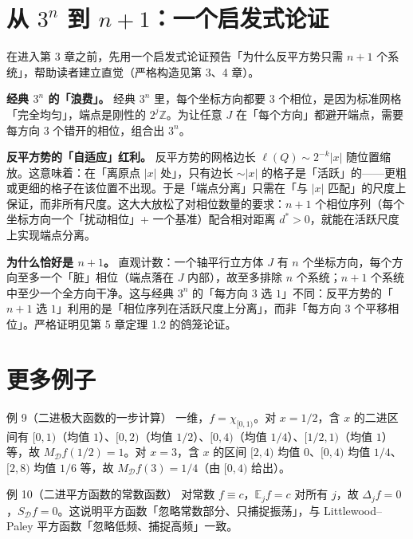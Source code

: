 \documentclass[a4paper,11pt,openany]{ctexbook}
\numberwithin{equation}{chapter}
\numberwithin{figure}{chapter}
\numberwithin{table}{chapter}
\begin{document}
\section{从 $3^n$ 到 $n+1$：一个启发式论证}

在进入第 3 章之前，先用一个启发式论证预告「为什么反平方势只需 $n+1$ 个系统」，帮助读者建立直觉（严格构造见第 3、4 章）。

\textbf{经典 $3^n$ 的「浪费」。} 经典 $3^n$ 里，每个坐标方向都要 $3$ 个相位，是因为标准网格「完全均匀」，端点是刚性的 $2^j\mathbb Z$。为让任意 $J$ 在「每个方向」都避开端点，需要每方向 $3$ 个错开的相位，组合出 $3^n$。

\textbf{反平方势的「自适应」红利。} 反平方势的网格边长 $\ell(Q)\sim2^{-k}|x|$ 随位置缩放。这意味着：在「离原点 $|x|$ 处」，只有边长 $\sim|x|$ 的格子是「活跃」的——更粗或更细的格子在该位置不出现。于是「端点分离」只需在「与 $|x|$ 匹配」的尺度上保证，而非所有尺度。这大大放松了对相位数量的要求：$n+1$ 个相位序列（每个坐标方向一个「扰动相位」+ 一个基准）配合相对距离 $d^*>0$，就能在活跃尺度上实现端点分离。

\textbf{为什么恰好是 $n+1$。} 直观计数：一个轴平行立方体 $J$ 有 $n$ 个坐标方向，每个方向至多一个「脏」相位（端点落在 $J$ 内部），故至多排除 $n$ 个系统；$n+1$ 个系统中至少一个全方向干净。这与经典 $3^n$ 的「每方向 $3$ 选 $1$」不同：反平方势的「$n+1$ 选 $1$」利用的是「相位序列在活跃尺度上分离」，而非「每方向 3 个平移相位」。严格证明见第 5 章定理 1.2 的鸽笼论证。

\section{更多例子}

\begin{examplebox}{例 9（二进极大函数的一步计算）}
一维，$f=\chi_{[0,1)}$。对 $x=1/2$，含 $x$ 的二进区间有 $[0,1)$（均值 $1$）、$[0,2)$（均值 $1/2$）、$[0,4)$（均值 $1/4$）、$[1/2,1)$（均值 $1$）等，故 $M_{\mathcal D}f(1/2)=1$。对 $x=3$，含 $x$ 的区间 $[2,4)$ 均值 $0$、$[0,4)$ 均值 $1/4$、$[2,8)$ 均值 $1/6$ 等，故 $M_{\mathcal D}f(3)=1/4$（由 $[0,4)$ 给出）。
\end{examplebox}

\begin{examplebox}{例 10（二进平方函数的常数函数）}
对常数 $f\equiv c$，$\mathbb E_j f=c$ 对所有 $j$，故 $\Delta_j f=0$，$S_{\mathcal D}f=0$。这说明平方函数「忽略常数部分、只捕捉振荡」，与 Littlewood–Paley 平方函数「忽略低频、捕捉高频」一致。
\end{examplebox}
\end{document}
